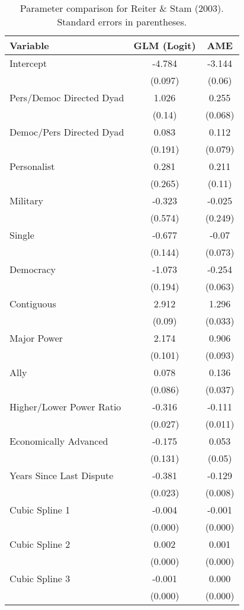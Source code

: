 \begin{table}[ht]
\centering
\begingroup\normalsize
\begin{tabular}{lcc}
 Variable & GLM (Logit) & AME \\ 
  \hline
\hline
Intercept & -4.784 & -3.144 \\ 
   & (0.097) & (0.06) \\ 
  Pers/Democ Directed Dyad & 1.026 & 0.255 \\ 
   & (0.14) & (0.068) \\ 
  Democ/Pers Directed Dyad & 0.083 & 0.112 \\ 
   & (0.191) & (0.079) \\ 
  Personalist & 0.281 & 0.211 \\ 
   & (0.265) & (0.11) \\ 
  Military & -0.323 & -0.025 \\ 
   & (0.574) & (0.249) \\ 
  Single & -0.677 & -0.07 \\ 
   & (0.144) & (0.073) \\ 
  Democracy & -1.073 & -0.254 \\ 
   & (0.194) & (0.063) \\ 
  Contiguous & 2.912 & 1.296 \\ 
   & (0.09) & (0.033) \\ 
  Major Power & 2.174 & 0.906 \\ 
   & (0.101) & (0.093) \\ 
  Ally & 0.078 & 0.136 \\ 
   & (0.086) & (0.037) \\ 
  Higher/Lower Power Ratio & -0.316 & -0.111 \\ 
   & (0.027) & (0.011) \\ 
  Economically Advanced & -0.175 & 0.053 \\ 
   & (0.131) & (0.05) \\ 
  Years Since Last Dispute & -0.381 & -0.129 \\ 
   & (0.023) & (0.008) \\ 
  Cubic Spline 1 & -0.004 & -0.001 \\ 
   & (0.000) & (0.000) \\ 
  Cubic Spline 2 & 0.002 & 0.001 \\ 
   & (0.000) & (0.000) \\ 
  Cubic Spline 3 & -0.001 & 0.000 \\ 
   & (0.000) & (0.000) \\ 
   \hline
\hline
\end{tabular}
\endgroup
\caption{Parameter comparison for Reiter \& Stam (2003). Standard errors in parentheses.} 
\label{tab:reiter_stam_coef}
\end{table}
